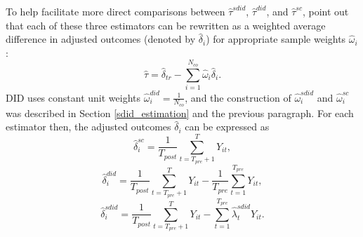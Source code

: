 \documentclass[../Main.tex]{subfiles}
\begin{document}
To help facilitate more direct comparisons between $\hat{\tau}^{sdid}$, $\hat{\tau}^{did}$, and $\hat{\tau}^{sc}$, \citet{arkhangelsky2021synthetic} point out that each of these three estimators can be rewritten as a weighted average difference in adjusted outcomes (denoted by $\hat{\delta}_i$) for appropriate sample weights $\hat{\omega}_i$:
\begin{equation} \label{eq:ave_effect_deltas}
    \hat{\tau}=\hat{\delta}_{tr}-\sum_{i=1}^{N_{co}}\hat{\omega}_i\hat{\delta}_i.
\end{equation}
DID uses constant unit weights $\hat{\omega}_i^{did}=\frac{1}{N_{co}}$, and the construction of $\hat{\omega}_i^{sdid}$ and $\hat{\omega}_i^{sc}$ was described in Section \ref{sdid_estimation} and the previous paragraph. For each estimator then, the adjusted outcomes $\hat{\delta}_i$ can be expressed as
\begin{equation} \label{eq:sc_deltas}
    \hat{\delta}_i^{sc}=\frac{1}{T_{post}}\sum_{t=T_{pre}+1}^TY_{it},
\end{equation}
\begin{equation} \label{eq:did_deltas}
    \hat{\delta}_i^{did}=\frac{1}{T_{post}}\sum_{t=T_{pre}+1}^TY_{it} - \frac{1}{T_{pre}}\sum_{t=1}^{T_{pre}}Y_{it},
\end{equation}
\begin{equation} \label{eq:sdid_deltas}
    \hat{\delta}_i^{sdid}=\frac{1}{T_{post}}\sum_{t=T_{pre}+1}^TY_{it} - \sum_{t=1}^{T_{pre}}\hat{\lambda}_t^{sdid}Y_{it}.
\end{equation}
\end{document}
